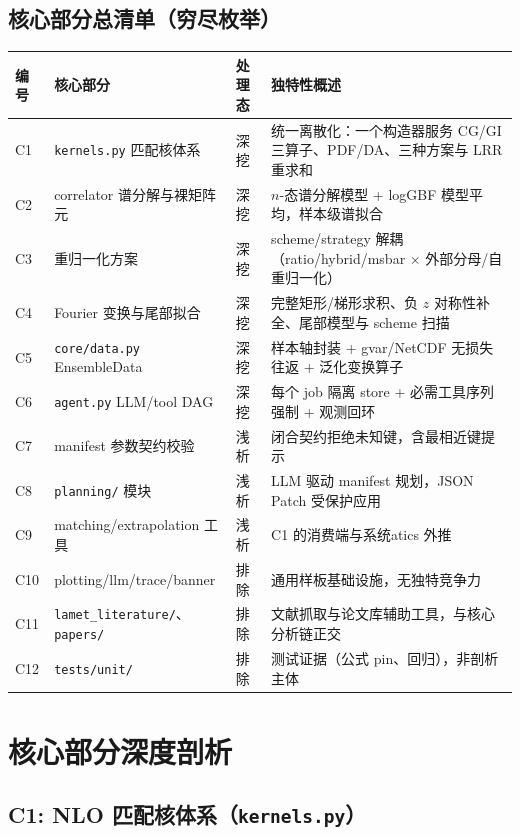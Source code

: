 \documentclass[UTF8]{ctexart}
\begin{document}
\subsection{核心部分总清单（穷尽枚举）}
\begin{xltabular}{\textwidth}{lllX}
\toprule
\textcolor{algo}{编号} & 核心部分 & 处理态 & 独特性概述 \\
\midrule
\endhead
C1 & \texttt{kernels.py} 匹配核体系 & 深挖 & 统一离散化：一个构造器服务 CG/GI 三算子、PDF/DA、三种方案与 LRR 重求和 \\
C2 & correlator 谱分解与裸矩阵元 & 深挖 & $n$-态谱分解模型 + logGBF 模型平均，样本级谱拟合 \\
C3 & 重归一化方案 & 深挖 & scheme/strategy 解耦（ratio/hybrid/msbar $\times$ 外部分母/自重归一化） \\
C4 & Fourier 变换与尾部拟合 & 深挖 & 完整矩形/梯形求积、负 $z$ 对称性补全、尾部模型与 scheme 扫描 \\
C5 & \texttt{core/data.py} EnsembleData & 深挖 & 样本轴封装 + gvar/NetCDF 无损失往返 + 泛化变换算子 \\
C6 & \texttt{agent.py} LLM/tool DAG & 深挖 & 每个 job 隔离 store + 必需工具序列强制 + 观测回环 \\
C7 & manifest 参数契约校验 & 浅析 & 闭合契约拒绝未知键，含最相近键提示 \\
C8 & \texttt{planning/} 模块 & 浅析 & LLM 驱动 manifest 规划，JSON Patch 受保护应用 \\
C9 & matching/extrapolation 工具 & 浅析 & C1 的消费端与系统atics 外推 \\
C10 & plotting/llm/trace/banner & 排除 & 通用样板基础设施，无独特竞争力 \\
C11 & \texttt{lamet\_literature/}、\texttt{papers/} & 排除 & 文献抓取与论文库辅助工具，与核心分析链正交 \\
C12 & \texttt{tests/unit/} & 排除 & 测试证据（公式 pin、回归），非剖析主体 \\
\bottomrule
\end{xltabular}

\section{核心部分深度剖析}

\subsection{C1: NLO 匹配核体系（\texttt{kernels.py}）}
\end{document}
